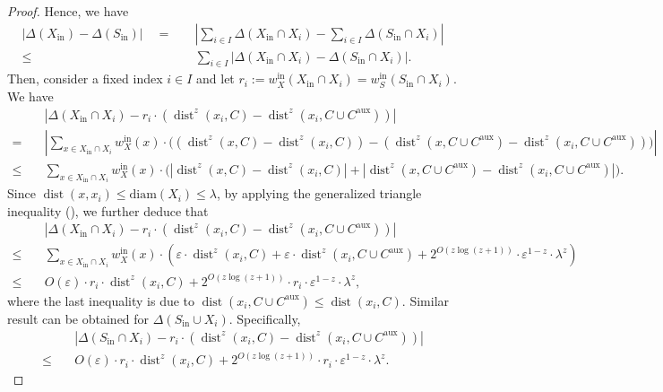 \documentclass[letterpaper,11pt]{article}
\theoremstyle{plain}
\theoremstyle{definition}
\theoremstyle{remark}
\DeclareMathOperator{\dist}{dist}
\newcommand{\diam}{\mathrm{diam}}
\newcommand{\inl}{\mathrm{in}}
\newcommand{\eps}{\varepsilon}
\newcommand{\aux}{\mathrm{aux}}
\begin{document}
\begin{proof}
    Hence, we have 
    \begin{equation}
        \label{eq:Delta}    
    \begin{aligned}
        \left|\Delta(X_\inl) - \Delta(S_\inl) \right|\quad
        =&\quad \left|\sum_{i\in I}\Delta(X_\inl\cap X_i) - \sum_{i\in I} \Delta(S_\inl\cap X_i) \right|\\
        \le&\quad \sum_{i\in I}\left|\Delta(X_\inl\cap X_i) - \Delta(S_\inl\cap X_i) \right|.
    \end{aligned}
    \end{equation}
    Then, consider a fixed index $i\in I$ and let $r_i:=w_X^\inl(X_\inl\cap X_i) = w_{S}^\inl(S_\inl\cap X_i)$. We have 
    \begin{align*}
        &\quad \left|\Delta(X_\inl\cap X_i) - r_i\cdot \left(\dist^z(x_i, C) - \dist^z(x_i,C\cup C^\aux) \right) \right|\\
        =&\quad \left|\sum_{x\in X_\inl\cap X_i} w_X^\inl(x)\cdot \big(\left(\dist^z(x,C) - \dist^z(x_i,C) \right) - \left(\dist^z(x,C\cup C^\aux) - \dist^z(x_i,C\cup C^\aux) \right) \big) \right|\\
        \le&\quad \sum_{x\in X_\inl\cap X_i}w_X^\inl(x)\cdot\big(\left|\dist^z(x,C) - \dist^z(x_i,C) \right| + \left|\dist^z(x,C\cup C^\aux) - \dist^z(x_i,C\cup C^\aux) \right| \big).
    \end{align*}
    Since $\dist(x,x_i)\le \diam(X_i)\le \lambda$, by applying the generalized triangle inequality (), we further deduce that 
    \begin{align*}
        &\quad \left|\Delta(X_\inl\cap X_i) - r_i\cdot \left(\dist^z(x_i, C) - \dist^z(x_i,C\cup C^\aux) \right) \right|\\
        \le&\quad \sum_{x\in X_\inl\cap X_i}w_X^\inl(x)\cdot\left(\eps\cdot \dist^z(x_i,C) + \eps\cdot \dist^z(x_i,C\cup C^\aux) + 2^{O(z\log(z+1))}\cdot \eps^{1-z}\cdot \lambda^z \right)\\
        \le&\quad O(\eps)\cdot r_i\cdot \dist^z(x_i,C) + 2^{O(z\log (z+1))}\cdot r_i\cdot \eps^{1-z}\cdot \lambda^z,
    \end{align*}
    where the last inequality is due to $\dist(x_i,C\cup C^\aux)\le \dist(x_i,C)$. Similar result can be obtained for $\Delta(S_\inl\cup X_i)$. Specifically,
    \begin{align*}
        &\quad \left|\Delta(S_\inl\cap X_i) - r_i\cdot \left(\dist^z(x_i, C) - \dist^z(x_i,C\cup C^\aux) \right) \right|\\
        \le&\quad O(\eps)\cdot r_i\cdot \dist^z(x_i,C) + 2^{O(z\log (z+1))}\cdot r_i\cdot \eps^{1-z}\cdot \lambda^z.

\end{align*}
\end{proof}
\end{document}
